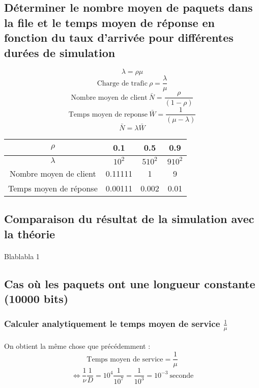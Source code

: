         \subsection{Déterminer le nombre moyen de paquets dans la file et le temps moyen de réponse en fonction du taux d'arrivée pour différentes durées de simulation}
\[  \lambda = \rho \mu \]
\[  \text{Charge de trafic} \ \rho = \frac{\lambda}{\mu} \]
\[  \text{Nombre moyen de client} \ \bar{N} = \frac{\rho}{(1 - \rho)} \]
\[  \text{Temps moyen de reponse} \ \bar{W} = \frac{1}{(\mu - \lambda)} \]
\[  \bar{N} = \lambda \bar{W} \]
\begin{center}
    \begin{tabular}{ | c | c| c | c | }
        \hline
            $\rho$ & 0.1 & 0.5 & 0.9 \\
        \hline
            $\lambda$ & $10^{2}$ & $5 10^{2}$ & $9 10^{2}$ \\
        \hline
            Nombre moyen de client & 0.11111 & 1 & 9 \\
        \hline
            Temps moyen de réponse & 0.00111 & 0.002 & 0.01 \\
        \hline
    \end{tabular}
\end{center}
%
        \subsection{Comparaison du résultat de la simulation avec la théorie}
            \paragraph{}
Blablabla 1
%
        \subsection{Cas où les paquets ont une longueur constante (10000 bits)}
%
            \subsubsection{Calculer analytiquement le temps moyen de service $\frac{1}{\mu}$}
%
                \paragraph{}
On obtient la même chose que précédemment :
\[  \text{Temps moyen de service} = \frac{1}{\mu} \]
\[ \iff \frac{1}{\nu} \frac{1}{D} = 10^{4} \frac{1}{10^{7}} = \frac{1}{10^{3}} = 10^{-3} \ \text{seconde} \]
%

